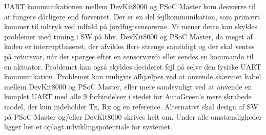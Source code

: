 UART kommunikationen mellem DevKit8000 og PSoC Master kom desværre til at fungere dårligere end forventet.
Der er en del fejlkommunikation, som primært kommer til udtryk ved udfald på jordfugtsensorerne. 
Vi mener dette kan skyldes problemer med timing i SW på hhv. DevKit8000 og PSoC Master, da meget af koden er interruptbaseret, der afvikles flere strenge samtidigt og der skal ventes på retursvar, når der spørges efter en sensorværdi eller sendes en kommando til en aktuator. 
Problemet kan også skyldes decideret fejl på selve den fysiske UART kommunikation.
Problemet kan muligvis afhjælpes ved at anvende skærmet kabel mellem DevKit8000 og PSoC Master, eller mere sandsynligt ved at anvende en komplet UART med alle 9 forbindelser i stedet for AutoGreen's mere skrabede model, der kun indeholder Tx, Rx og en reference.
Alternativt skal design af SW på PSoC Master og/eller DevKit8000 skrives helt om. 
Under alle omstændigheder ligger her et oplagt udviklingspotentiale for systemet.
\clearpage